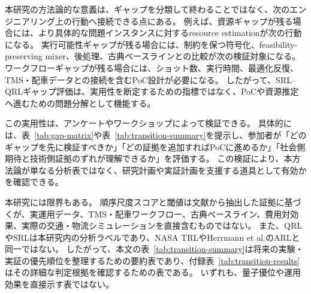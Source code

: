 本研究の方法論的な意義は、ギャップを分類して終わることではなく、次のエンジニアリング上の行動へ接続できる点にある。
例えば、資源ギャップが残る場合には、より具体的な問題インスタンスに対するresource estimationが次の行動になる。
実行可能性ギャップが残る場合には、制約を保つ符号化、feasibility-preserving mixer、後処理、古典ベースラインとの比較が次の検証対象になる。
ワークフローギャップが残る場合には、ショット数、実行時間、最適化反復、TMS・配車データとの接続を含むPoC設計が必要になる。
したがって、SRL--QRLギャップ評価は、実用性を断定するための指標ではなく、PoCや資源推定へ進むための問題分解として機能する。

この実用性は、アンケートやワークショップによって検証できる。
具体的には、表~\ref{tab:gap-matrix}や表~\ref{tab:transition-summary}を提示し、参加者が「どのギャップを先に検証すべきか」「どの証拠を追加すればPoCに進めるか」「社会側期待と技術側証拠のずれが理解できるか」を評価する。
この検証により、本方法論が単なる分析表ではなく、研究計画や実証計画を支援する道具として有効かを確認できる。

本研究には限界もある。
順序尺度スコアと閾値は文献から抽出した証拠に基づくが、実運用データ、TMS・配車ワークフロー、古典ベースライン、費用対効果、実際の交通・物流シミュレーションを直接含むものではない。
また、QRLやSRLは本研究内の分析ラベルであり、NASA TRLやHerrmann et al.のARLと同一ではない。
したがって、本文の表~\ref{tab:transition-summary}は将来の実験・実証の優先順位を整理するための要約表であり、付録表~\ref{tab:transition-results}はその詳細な判定根拠を確認するための表である。
いずれも、量子優位や運用効果を直接示す表ではない。
